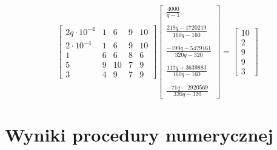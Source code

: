 \documentclass[a4paper]{article}
\begin{document}
$$
\left[
\begin{array}{ccccc}
2q\cdot 10^{-4} & 1&6&9&10\\
2\cdot 10^{-4}&1&6&9&10\\
1&6&6&8&6\\
5&9&10&7&9\\
3&4&9&7&9
\end{array}
\right]
\left[
\begin{array}
{c}
\frac{4000}{q-1}\\ \\
\frac{219q-1720219}{160q-160}\\ \\
\frac{-199q-5479161}{320q-320}\\ \\
\frac{117q+3639883}{160q-160}\\ \\
\frac{-71q-2920569}{320q-320}
\end{array}
\right]
=
\left[
\begin{array}
{c}
10\\
2\\
9\\
9\\
3
\end{array}
\right]
$$
\section{Wyniki procedury numerycznej}
\end{document}
